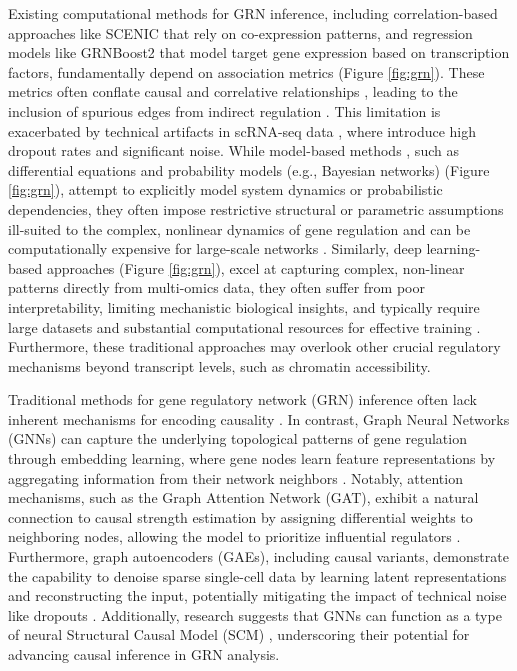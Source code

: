 Existing computational methods for GRN inference, including correlation-based approaches like SCENIC \cite{aibar2017scenic,bravo2023scenic} that rely on co-expression patterns, and regression models like GRNBoost2 \cite{moerman2019grnboost2} that model target gene expression based on transcription factors, fundamentally depend on association metrics (Figure \ref{fig:grn}). These metrics often conflate causal and correlative relationships \cite{feng2023gene,kim2023gene,mao2023predicting}, leading to the inclusion of spurious edges from indirect regulation \cite{badia2023gene}. This limitation is exacerbated by technical artifacts in scRNA-seq data \cite{wang2024grace}, where introduce high dropout rates and significant noise. While model-based methods \cite{lei2024deepgrncs, feng2023gene}, such as differential equations and probability models (e.g., Bayesian networks) (Figure \ref{fig:grn}), attempt to explicitly model system dynamics or probabilistic dependencies, they often impose restrictive structural or parametric assumptions ill-suited to the complex, nonlinear dynamics of gene regulation and can be computationally expensive for large-scale networks \cite{badia2023gene, feng2023gene}. Similarly, deep learning-based approaches (Figure \ref{fig:grn}), excel at capturing complex, non-linear patterns directly from multi-omics data, they often suffer from poor interpretability, limiting mechanistic biological insights, and typically require large datasets and substantial computational resources for effective training \cite{kim2023gene,shu2021modeling,dong2024deep}. Furthermore, these traditional approaches may overlook other crucial regulatory mechanisms beyond transcript levels, such as chromatin accessibility.

Traditional methods for gene regulatory network (GRN) inference often lack inherent mechanisms for encoding causality \cite{dibaeinia2025interpretable,job2023exploring}. In contrast, Graph Neural Networks (GNNs) can capture the underlying topological patterns of gene regulation through embedding learning, where gene nodes learn feature representations by aggregating information from their network neighbors \cite{otal2024analysis,mao2023predicting,xu2018powerful}. Notably, attention mechanisms, such as the Graph Attention Network (GAT), exhibit a natural connection to causal strength estimation by assigning differential weights to neighboring nodes, allowing the model to prioritize influential regulators \cite{otal2024analysis,wang2024grace,zevcevic2021relating}. Furthermore, graph autoencoders (GAEs), including causal variants, demonstrate the capability to denoise sparse single-cell data by learning latent representations and reconstructing the input, potentially mitigating the impact of technical noise like dropouts \cite{zevcevic2021relating,wang2024grace,mao2023predicting}. Additionally, research suggests that GNNs can function as a type of neural Structural Causal Model (SCM) \cite{zevcevic2021relating}, underscoring their potential for advancing causal inference in GRN analysis.

